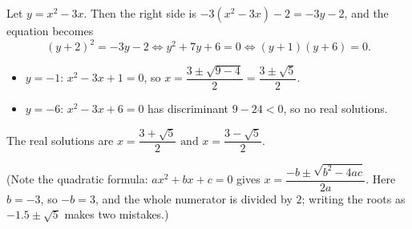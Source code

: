 Let $y=x^2-3x$. Then the right side is $-3\left(x^2-3x\right)-2=-3y-2$, and the equation becomes
\[
(y+2)^2=-3y-2\iff y^2+7y+6=0\iff(y+1)(y+6)=0 .
\]
\begin{itemize}
\item $y=-1$: $x^2-3x+1=0$, so $x=\dfrac{3\pm\sqrt{9-4}}{2}=\dfrac{3\pm\sqrt5}{2}$.
\item $y=-6$: $x^2-3x+6=0$ has discriminant $9-24<0$, so no real solutions.
\end{itemize}
The real solutions are $\boxed{x=\dfrac{3+\sqrt5}{2}\text{ and }x=\dfrac{3-\sqrt5}{2}}$.

(Note the quadratic formula: $ax^2+bx+c=0$ gives $x=\dfrac{-b\pm\sqrt{b^2-4ac}}{2a}$. Here $b=-3$, so $-b=3$, and the whole numerator is divided by $2$; writing the roots as $-1.5\pm\sqrt5$ makes two mistakes.)
